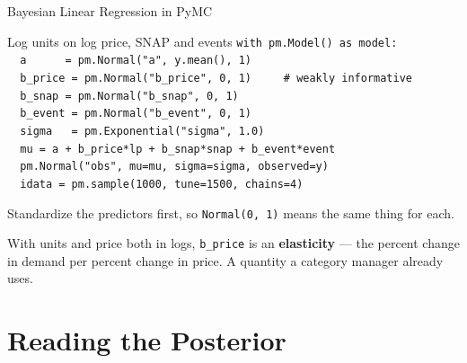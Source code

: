 \documentclass[aspectratio=169, 11pt]{beamer}
\begin{document}
\begin{frame}{Bayesian Linear Regression in PyMC}
  \begin{examplebox}{Log units on log price, SNAP and events}
    {\tiny\linespread{1.05}\selectfont
    \texttt{with pm.Model() as model:}\\
    \texttt{\ \ a\ \ \ \ \ \ = pm.Normal("a", y.mean(), 1)}\\
    \texttt{\ \ b\_price = pm.Normal("b\_price", 0, 1)\ \ \ \ \ \# weakly informative}\\
    \texttt{\ \ b\_snap\ = pm.Normal("b\_snap",\ 0, 1)}\\
    \texttt{\ \ b\_event = pm.Normal("b\_event", 0, 1)}\\
    \texttt{\ \ sigma\ \ \ = pm.Exponential("sigma", 1.0)}\\[2pt]
    \texttt{\ \ mu = a + b\_price*lp + b\_snap*snap + b\_event*event}\\
    \texttt{\ \ pm.Normal("obs", mu=mu, sigma=sigma, observed=y)}\\[2pt]
    \texttt{\ \ idata = pm.sample(1000, tune=1500, chains=4)}
    }
  \end{examplebox}
  Standardize the predictors first, so \texttt{Normal(0, 1)} means the same thing for each.

  \vspace{0.1cm}
  With units and price both in logs, \texttt{b\_price} is an \textbf{elasticity} --- the percent
  change in demand per percent change in price. A quantity a category manager already uses.
\end{frame}

\section{Reading the Posterior}

\end{document}
